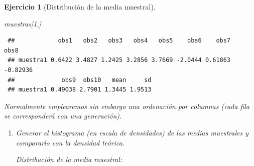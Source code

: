 \documentclass[
  10pt,
]{book}
\newenvironment{Shaded}{\begin{snugshade}}{\end{snugshade}}
\newcommand{\AttributeTok}[1]{\textcolor[rgb]{0.77,0.63,0.00}{#1}}
\newcommand{\CommentTok}[1]{\textcolor[rgb]{0.56,0.35,0.01}{\textit{#1}}}
\newcommand{\ConstantTok}[1]{\textcolor[rgb]{0.00,0.00,0.00}{#1}}
\newcommand{\DecValTok}[1]{\textcolor[rgb]{0.00,0.00,0.81}{#1}}
\newcommand{\FunctionTok}[1]{\textcolor[rgb]{0.00,0.00,0.00}{#1}}
\newcommand{\NormalTok}[1]{#1}
\newcommand{\SpecialCharTok}[1]{\textcolor[rgb]{0.00,0.00,0.00}{#1}}
\newcommand{\StringTok}[1]{\textcolor[rgb]{0.31,0.60,0.02}{#1}}
\theoremstyle{break}
\newtheorem{exercise}{Ejercicio}[chapter]
\theoremstyle{nonumberplain}
\renewcommand{\CommentTok}[1]{\textcolor[rgb]{0.41,0.41,0.41}{\texttt{#1}}}
\begin{document}
\begin{exercise}[Distribución de la media muestral]
\begin{enumerate}
\begin{Shaded}
\begin{Highlighting}[]
\NormalTok{muestras[}\DecValTok{1}\NormalTok{,]}
\end{Highlighting}
\end{Shaded}

\begin{verbatim}
 ##            obs1   obs2   obs3   obs4   obs5    obs6    obs7     obs8
 ## muestra1 0.6422 3.4827 1.2425 3.2856 3.7669 -2.0444 0.61863 -0.82936
 ##             obs9  obs10   mean     sd
 ## muestra1 0.49038 2.7901 1.3445 1.9513
\end{verbatim}
\end{enumerate}

Normalmente emplearemos sin embargo una ordenación por columnas (cada fila se corresponderá con una generación).

\begin{enumerate}
\def\labelenumi{\alph{enumi})}
\setcounter{enumi}{1}
\item
  Generar el histograma (en escala de densidades) de las medias
  muestrales y compararlo con la densidad teórica.

  Distribución de la media muestral:

\begin{Shaded}
\end{Shaded}


\end{enumerate}
\end{exercise}
\end{document}
